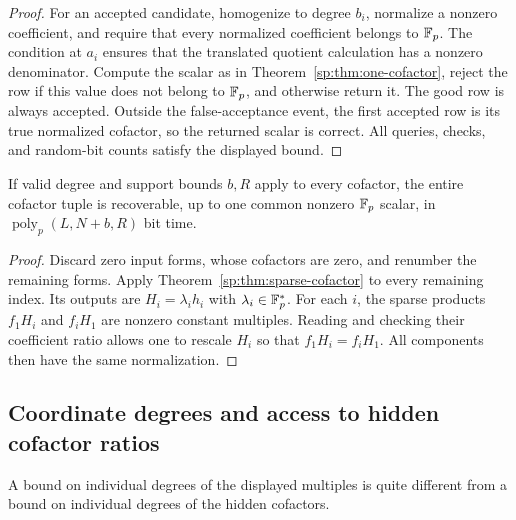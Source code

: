 \begin{proof}
For an accepted candidate, homogenize to degree $b_i$, normalize a
nonzero coefficient, and require that every normalized coefficient
belongs to $\mathbb F_p$. The condition at $a_i$ ensures that the translated
quotient calculation has a nonzero denominator. Compute the scalar
as in Theorem~\ref{sp:thm:one-cofactor}, reject the row if this value
does not belong to $\mathbb F_p$, and otherwise return it. The good row is always
accepted. Outside the false-acceptance event, the first accepted row
is its true normalized cofactor, so the returned scalar is correct.
All queries, checks, and random-bit counts satisfy the displayed bound.
\end{proof}

\begin{corollary}
\label{sp:cor:sparse-tuple}
If valid degree and support bounds $b,R$ apply to every cofactor,
the entire cofactor tuple is recoverable, up to one common nonzero
$\mathbb F_p$ scalar, in $\operatorname{poly}_p(L,N+b,R)$ bit time.
\end{corollary}
\begin{proof}
Discard zero input forms, whose cofactors are zero, and renumber the
remaining forms. Apply Theorem~\ref{sp:thm:sparse-cofactor} to every
remaining index. Its outputs
are $H_i=\lambda_i h_i$ with $\lambda_i\in\mathbb F_p^*$.
For each $i$, the sparse products $f_1H_i$ and $f_iH_1$ are nonzero
constant multiples. Reading and checking their coefficient ratio
allows one to rescale $H_i$ so that $f_1H_i=f_iH_1$.
All components then have the same normalization.
\end{proof}

\subsection{Coordinate degrees and access to hidden cofactor ratios}
A bound on individual degrees of the displayed multiples is quite different
from a bound on individual degrees of the hidden cofactors.

